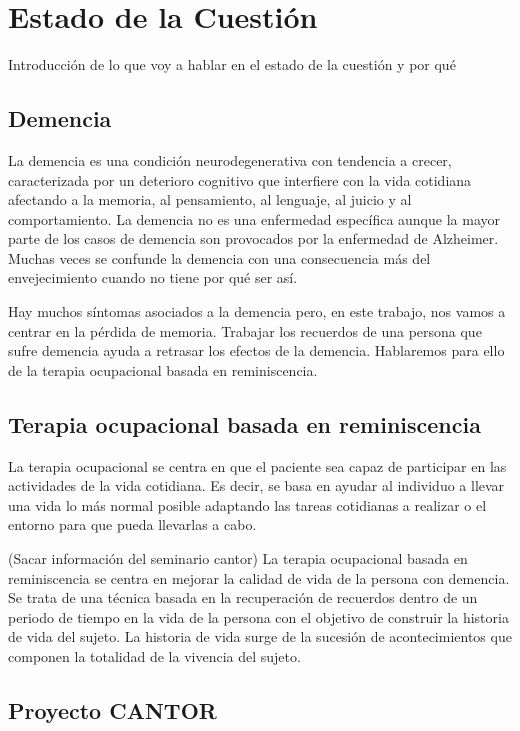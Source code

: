 \chapter{Estado de la Cuestión}
\label{cap:estadoDeLaCuestion}

Introducción de lo que voy a hablar en el estado de la cuestión y por qué

\section{Demencia}
La demencia \citep{demencia} es una condición neurodegenerativa con tendencia a crecer, caracterizada por un deterioro cognitivo que interfiere con la vida cotidiana afectando a la memoria, al pensamiento, al lenguaje, al juicio y al comportamiento. La demencia no es una enfermedad específica aunque la mayor parte de los casos de demencia son provocados por la enfermedad de Alzheimer. Muchas veces se confunde la demencia con una consecuencia más del envejecimiento cuando no tiene por qué ser así.

Hay muchos síntomas asociados a la demencia pero, en este trabajo, nos vamos a centrar en la pérdida de memoria. Trabajar los recuerdos de una persona que sufre demencia ayuda a retrasar los efectos de la demencia. Hablaremos para ello de la terapia ocupacional basada en reminiscencia.

\section{Terapia ocupacional basada en reminiscencia}
La terapia ocupacional \citep{terapia} se centra en que el paciente sea capaz de participar en las actividades de la vida cotidiana. Es decir, se basa en ayudar al individuo a llevar una vida lo más normal posible adaptando las tareas cotidianas a realizar o el entorno para que pueda llevarlas a cabo.

(Sacar información del seminario cantor)
La terapia ocupacional basada en reminiscencia se centra en mejorar la calidad de vida de la persona con demencia. Se trata de una técnica basada en la recuperación de recuerdos dentro de un periodo de tiempo en la vida de la persona con el objetivo de construir la historia de vida del sujeto. La historia de vida surge de la sucesión de acontecimientos que componen la totalidad de la vivencia del sujeto.



\section{Proyecto CANTOR}
\citep{cantor}


